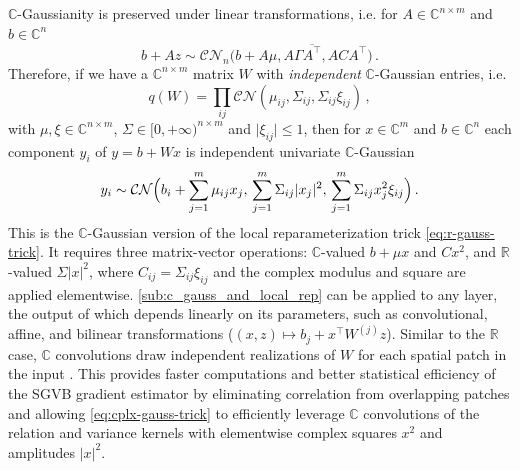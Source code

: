 \documentclass[a4paper,10pt,twocolumn]{article}
\newcommand{\real}{\mathbb{R}}
\newcommand{\cplx}{\mathbb{C}}
\newcommand{\conj}[1]{\overline{#1}}
\begin{document}
$\cplx$-Gaussianity is preserved under linear transformations, i.e. for $
  A \in \cplx^{n \times m}
$ and $b \in \cplx^{n}$
\begin{equation}  \label{eq:cn-affine}
  b + A z \sim \mathcal{C}\mathcal{N}_n\bigl(
      b + A\mu, A \Gamma \conj{A^\top}, A C A^\top
    \bigr)
  \,.
\end{equation}
Therefore, if we have a $\cplx^{n\times m}$ matrix $W$ with \emph{independent}
$\cplx$-Gaussian entries, i.e.
\begin{equation}  \label{eq:c-gauss-vi-general}
  q(W)
    = \prod_{ij} \mathcal{CN}(
      \mu_{ij}, \Sigma_{ij}, \Sigma_{ij} \xi_{ij}
    )
  \,,
\end{equation}
with $
  \mu, \xi \in \cplx^{n\times m}
$, $\Sigma \in [0, +\infty)^{n\times m}$ and $
  \lvert \xi_{ij} \rvert \leq 1
$, then for $x \in \cplx^m$ and $b \in \cplx^n$ each component $y_i$ of $y = b + W x$
is independent univariate $\cplx$-Gaussian
\begin{equation}  \label{eq:cplx-gauss-trick}
  y_i
    \sim \mathcal{C}\mathcal{N}
      \Bigl(
        b_i + \sum_{j=1}^m \mu_{ij} x_j,
        \, \sum_{j=1}^m \Sigma_{ij} \lvert x_j \rvert^2,
        \, \sum_{j=1}^m \Sigma_{ij} x_j^2 \xi_{ij}
      \Bigr)
    \,.
\end{equation}
This is the $\cplx$-Gaussian version of the local reparameterization trick \eqref{eq:r-gauss-trick}.
It requires three matrix-vector operations: $\cplx$-valued $b + \mu x$ and $C x^2$,
and $\real$-valued $
  \Sigma \lvert x \rvert^2
$, where $C_{ij} = \Sigma_{ij} \xi_{ij}$ and the complex modulus and square are applied
elementwise. \eqref{sub:c_gauss_and_local_rep} can be applied to any layer, the output
of which depends linearly on its parameters, such as convolutional, affine, and bilinear
transformations ($
  (x, z) \mapsto b_j + x^\top W^{(j)} z
$). Similar to the $\real$ case, $\cplx$ convolutions draw independent realizations of $W$
for each spatial patch in the input \citep{molchanov_variational_2017}. This provides
faster computations and better statistical efficiency of the SGVB gradient estimator
by eliminating correlation from overlapping patches \citep{kingma_variational_2015} and
allowing \eqref{eq:cplx-gauss-trick} to efficiently leverage $\cplx$ convolutions of
the relation and variance kernels with elementwise complex squares $x^2$ and amplitudes
$\lvert x \rvert^2$.
\end{document}
